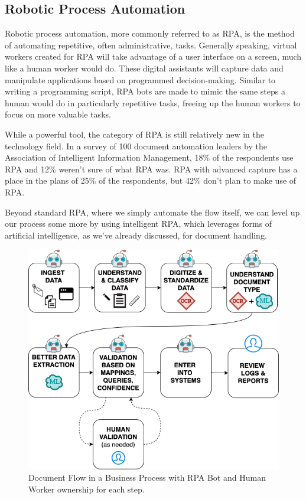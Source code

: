 \documentclass[conference]{IEEEtran}
\begin{document}
\subsection{Robotic Process Automation}
Robotic process automation, more commonly referred to as RPA, is the method of automating repetitive, often administrative, tasks. Generally speaking, virtual workers created for RPA will take advantage of a user interface on a screen, much like a human worker would do. These digital assistants will capture data and manipulate applications based on programmed decision-making. Similar to writing a programming script, RPA bots are made to mimic the same steps a human would do in particularly repetitive tasks, freeing up the human workers to focus on more valuable tasks.

While a powerful tool, the category of RPA is still relatively new in the technology field. In a survey of 100 document automation leaders by the Association of Intelligent Information Management, 18\% of the respondents use RPA and 12\% weren't sure of what RPA was. RPA with advanced capture has a place in the plans of 25\% of the respondents, but 42\% don't plan to make use of RPA. \cite{hollander2019survey}

Beyond standard RPA, where we simply automate the flow itself, we can level up our process some more by using intelligent RPA, which leverages forms of artificial intelligence, as we've already discussed, for document handling.

\begin{figure}[ht]
\centerline{\includegraphics[width=\columnwidth]{BotFlow.png}}
\caption{Document Flow in a Business Process with RPA Bot and Human Worker ownership for each step.}
\label{figBotFlow}
\end{figure}
\end{document}
